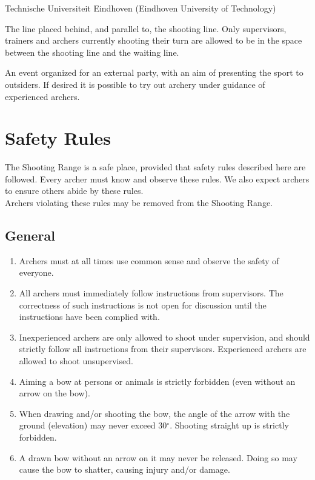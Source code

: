 \documentclass[a4paper]{article}
\begin{document}
\begin{description}[font=\sffamily\bfseries, leftmargin=1cm, style=nextline]
    \item[{\defi TU/e}]
    Technische Universiteit Eindhoven (Eindhoven University of Technology)
    \item[{\defi Waiting Line}]
The line placed behind, and parallel to, the { shooting line}. Only { supervisors}, trainers and { archers} currently shooting their turn are allowed to be in the space between the { shooting line} and the { waiting line}. 
  \item[{\defi Workshop}]
    An event organized for an external party, with an aim of presenting the sport to outsiders. If desired it is possible to try out archery under guidance of experienced { archers}.
\end{description}

\pagebreak

\section{Safety Rules}
\label{safety}
The Shooting Range is a safe place, provided that safety rules described here are followed. Every { archer} must know and observe these rules. We also expect { archers} to ensure others abide by these rules. \\

{ Archers} violating these rules may be removed from the Shooting Range. \\

\subsection{General}

\begin{enumerate}
  \item { Archers} must at all times use common sense and observe the safety of everyone.
  \item All { archers} must immediately follow instructions from { supervisors}. The correctness of such instructions is not open for discussion until the instructions have been complied with.
  \item { Inexperienced} { archers} are only allowed to shoot under supervision, and should strictly follow all instructions from their { supervisors}. { Experienced} { archers} are allowed to shoot unsupervised.
  \item Aiming a bow at persons or animals is strictly forbidden (even without an arrow on the bow).
  \item When drawing and/or shooting the bow, the angle of the arrow with the ground (elevation) may never exceed 30$^\circ$. Shooting straight up is strictly forbidden.
  \item A drawn bow without an arrow on it may never be released. Doing so may cause the bow to shatter, causing injury and/or damage.
\end{enumerate}
\end{document}
